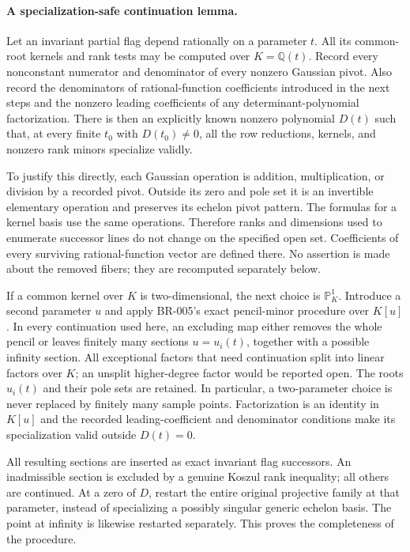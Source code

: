 \paragraph{A specialization-safe continuation lemma.}
Let an invariant partial flag depend rationally on a parameter $t$.
All its common-root kernels and rank tests may be computed over
$K=\mathbb Q(t)$.  Record every nonconstant numerator and denominator
of every nonzero Gaussian pivot.  Also record the denominators of
rational-function coefficients introduced in the next steps and the
nonzero leading coefficients of any determinant-polynomial factorization.
There is then an explicitly known nonzero polynomial $D(t)$ such that,
at every finite $t_0$ with $D(t_0)\ne0$, all the row reductions, kernels,
and nonzero rank minors specialize validly.

To justify this directly, each Gaussian operation is addition,
multiplication, or division by a recorded pivot.  Outside its zero and
pole set it is an invertible elementary operation and preserves its
echelon pivot pattern.  The formulas for a kernel basis use the same
operations.  Therefore ranks and dimensions used to enumerate successor
lines do not change on the specified open set.  Coefficients of every
surviving rational-function vector are defined there.  No assertion is
made about the removed fibers; they are recomputed separately below.

If a common kernel over $K$ is two-dimensional, the next choice is
$\mathbb P^1_K$.  Introduce a second parameter $u$ and apply BR-005's
exact pencil-minor procedure over $K[u]$.  In every continuation used
here, an excluding map either removes the whole pencil or leaves
finitely many sections $u=u_i(t)$, together with a possible infinity
section.  All exceptional factors that need continuation split into
linear factors over $K$; an unsplit higher-degree factor would be
reported open.  The roots $u_i(t)$ and their pole sets are retained.
In particular, a two-parameter choice is never replaced by finitely
many sample points.  Factorization is an identity in $K[u]$ and the
recorded leading-coefficient and denominator conditions make its
specialization valid outside $D(t)=0$.

All resulting sections are inserted as exact invariant flag successors.
An inadmissible section is excluded by a genuine Koszul rank inequality;
all others are continued.  At a zero of $D$, restart the entire original
projective family at that parameter, instead of specializing a possibly
singular generic echelon basis.  The point at infinity is likewise
restarted separately.  This proves the completeness of the procedure.

